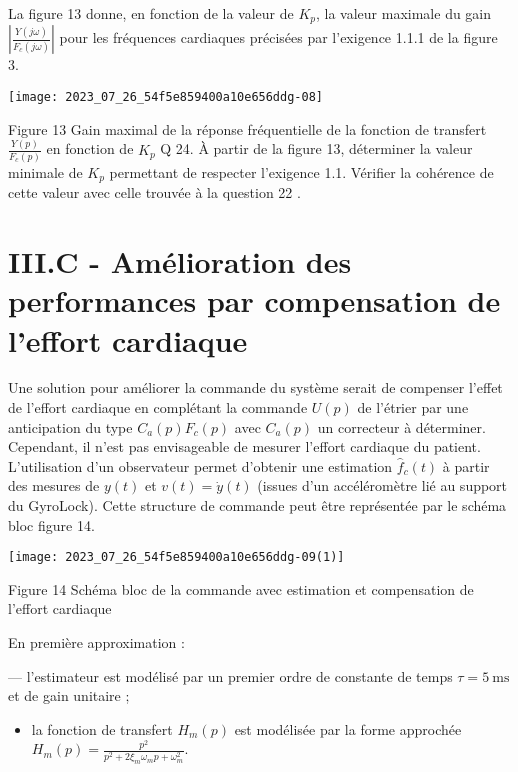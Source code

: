 La figure 13 donne, en fonction de la valeur de $K_{p}$, la valeur maximale du gain $\left|\frac{Y(j \omega)}{F_{c}(j \omega)}\right|$ pour les fréquences cardiaques précisées par l'exigence 1.1.1 de la figure 3.

\begin{center}
\texttt{[image: 2023\_07\_26\_54f5e859400a10e656ddg-08]}
\end{center}

Figure 13 Gain maximal de la réponse fréquentielle de la fonction de transfert $\frac{Y(p)}{F_{c}(p)}$ en fonction de $K_{p}$ Q 24. À partir de la figure 13, déterminer la valeur minimale de $K_{p}$ permettant de respecter l'exigence 1.1. Vérifier la cohérence de cette valeur avec celle trouvée à la question 22 .

\section{III.C - Amélioration des performances par compensation de l'effort cardiaque}
Une solution pour améliorer la commande du système serait de compenser l'effet de l'effort cardiaque en complétant la commande $U(p)$ de l'étrier par une anticipation du type $C_{a}(p) F_{c}(p)$ avec $C_{a}(p)$ un correcteur à déterminer. Cependant, il n'est pas envisageable de mesurer l'effort cardiaque du patient. L'utilisation d'un observateur permet d'obtenir une estimation $\hat{f}_{c}(t)$ à partir des mesures de $y(t)$ et $v(t)=\dot{y}(t)$ (issues d'un accéléromètre lié au support du GyroLock). Cette structure de commande peut être représentée par le schéma bloc figure 14.

\begin{center}
\texttt{[image: 2023\_07\_26\_54f5e859400a10e656ddg-09(1)]}
\end{center}

Figure 14 Schéma bloc de la commande avec estimation et compensation de l'effort cardiaque

En première approximation :

— l'estimateur est modélisé par un premier ordre de constante de temps $\tau=5 \mathrm{~ms}$ et de gain unitaire ;

\begin{itemize}
  \item la fonction de transfert $H_{m}(p)$ est modélisée par la forme approchée $H_{m}(p)=\frac{p^{2}}{p^{2}+2 \xi_{m} \omega_{m} p+\omega_{m}^{2}}$.
\end{itemize}

